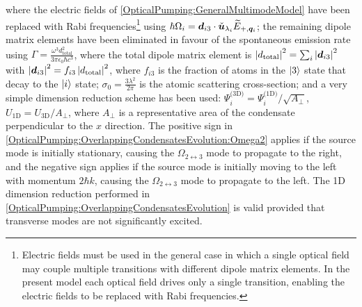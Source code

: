 where the electric fields of \eqref{OpticalPumping:GeneralMultimodeModel} have been replaced with Rabi frequencies\footnote{Electric fields must be used in the general case in which a single optical field may couple multiple transitions with different dipole matrix elements.  In the present model each optical field drives only a single transition, enabling the electric fields to be replaced with Rabi frequencies.} using $\hbar \Omega_i = \bm{d}_{i 3} \cdot \check{\bm{u}}_{\lambda_i} \widetilde{E}_{+, \bm{q}_i}$; the remaining dipole matrix elements have been eliminated in favour of the spontaneous emission rate using $\displaystyle \Gamma = \frac{\omega^3 d_\text{total}^2}{3 \pi \epsilon_0 \hbar c^3}$, where the total dipole matrix element is $\left|d_\text{total}\right|^2 = \sum_{i} \left|\bm{d}_{i3}\right|^2$ with $\left|\bm{d}_{i3}\right|^2 = f_{i3} \left|d_\text{total}\right|^2$, where $f_{i3}$ is the fraction of atoms in the ${\left|3\right>}$ state that decay to the ${\left|i\right>}$ state; $\displaystyle\sigma_0 = \frac{3 \lambda^2}{2 \pi}$ is the atomic scattering cross-section; and a very simple dimension reduction scheme has been used: $\Psi_i^\text{(3D)} = \Psi_i^\text{(1D)} / \sqrt{A_\perp}$, $U_\text{1D} = U_\text{3D} / A_\perp$, where $A_\perp$ is a representative area of the condensate perpendicular to the $x$ direction.  The positive sign in \eqref{OpticalPumping:OverlappingCondensatesEvolution:Omega2} applies if the source mode is initially stationary, causing the $\Omega_{2\leftrightarrow 3}$ mode to propagate to the right, and the negative sign applies if the source mode is initially moving to the left with momentum $2 \hbar k$, causing the $\Omega_{2\leftrightarrow 3}$ mode to propagate to the left.  The 1D dimension reduction performed in \eqref{OpticalPumping:OverlappingCondensatesEvolution} is valid provided that transverse modes are not significantly excited.

